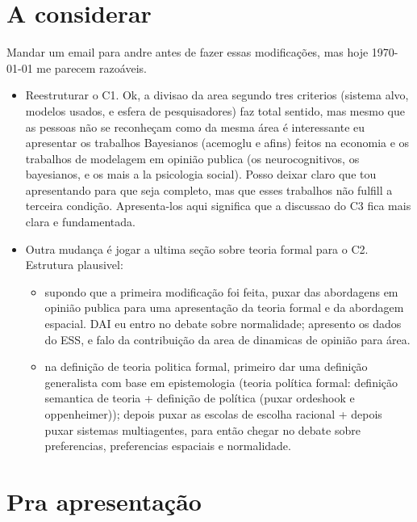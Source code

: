 \documentclass{article}
\begin{document}
\section*{A considerar}

Mandar um email para andre antes de fazer essas modificações, mas hoje \today
\hspace{0.1cm} me parecem razoáveis.

\begin{itemize}
\item Reestruturar o C1. Ok, a divisao da area segundo tres criterios (sistema
  alvo, modelos usados, e esfera de pesquisadores) faz total sentido, mas mesmo
  que as pessoas não se reconheçam como da mesma área é interessante eu
  apresentar os trabalhos Bayesianos (acemoglu e afins) feitos na economia e os trabalhos de
  modelagem em opinião publica (os neurocognitivos, os bayesianos, e os mais a
  la psicologia social). Posso deixar claro que tou apresentando para que seja
  completo, mas que esses trabalhos não fulfill a terceira condição.
  Apresenta-los aqui significa que a discussao do C3 fica mais clara e
  fundamentada.
\item Outra mudança é jogar a ultima seção sobre teoria formal para o C2.
  Estrutura plausivel:
  \begin{itemize}
  \item supondo que a primeira modificação foi feita, puxar das abordagens em
    opinião publica para uma apresentação da teoria formal e da abordagem
    espacial. DAI eu entro no debate sobre normalidade; apresento os dados do
    ESS, e falo da contribuição da area de dinamicas de opinião para área.
  \item na definição de teoria politica formal, primeiro dar uma definição
    generalista com base em epistemologia (teoria política formal: definição
    semantica de teoria + definição de política (puxar ordeshook e
    oppenheimer)); depois puxar as escolas de escolha racional + depois puxar
    sistemas multiagentes, para então chegar no debate sobre preferencias,
    preferencias espaciais e normalidade. 
  \end{itemize}
\end{itemize}


\section*{Pra apresentação}
\end{document}
